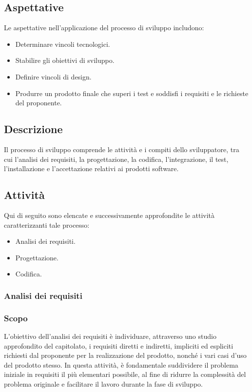 \documentclass{article}
\begin{document}
\subsection{Aspettative}
Le aspettative nell'applicazione del processo di sviluppo includono:
\begin{itemize}
    \item Determinare vincoli tecnologici.
    \item Stabilire gli obiettivi di sviluppo.
    \item Definire vincoli di design.
    \item Produrre un prodotto finale che superi i test e soddisfi i requisiti e le richieste del proponente.
\end{itemize}

\subsection{Descrizione}
Il processo di sviluppo comprende le attività e i compiti dello sviluppatore, tra cui l'analisi dei requisiti, la progettazione, la codifica, l'integrazione, il test, l'installazione e l'accettazione relativi ai prodotti software.

\subsection{Attività}
Qui di seguito sono elencate e successivamente approfondite le attività caratterizzanti tale processo:
\begin{itemize}
    \item Analisi dei requisiti.
    \item Progettazione.
    \item Codifica.
\end{itemize}
\subsubsection{Analisi dei requisiti}
\subsubsection*{Scopo}
L'obiettivo dell'analisi dei requisiti è individuare, attraverso uno studio approfondito del capitolato, i requisiti diretti e indiretti, impliciti ed espliciti richiesti dal proponente per la realizzazione del prodotto, nonché i vari casi d'uso del prodotto stesso. In questa attività, è fondamentale suddividere il problema iniziale in requisiti il più elementari possibile, al fine di ridurre la complessità del problema originale e facilitare il lavoro durante la fase di sviluppo.
\end{document}
